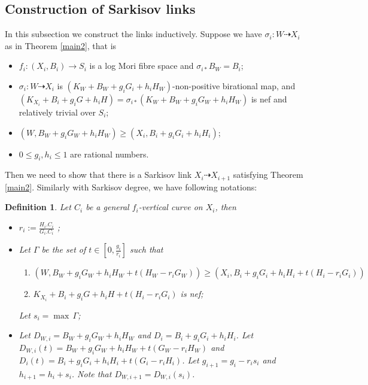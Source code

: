 \documentclass[11pt]{amsart}
\newtheorem{defn}{Definition}[section]
\begin{document}
\subsection{Construction of Sarkisov links}
In this subsection we construct the links inductively. Suppose we have $\sigma_{i}:W\dashrightarrow X_{i}$ as in Theorem  \ref{main2}, that is 
\begin{itemize}
  \item $f_{i}:(X_{i},B_{i})\to S_{i}$ is a log Mori fibre space and $\sigma_{i*} B_{W}=B_{i}$;
  \item $\sigma_{i}:W\dashrightarrow  X_{i}$ is $(K_{W}+B_{W}+g_{i}G_{i}+h_{i}H_{W})$-non-positive birational map, and $(K_{X_{i}}+B_{i}+g_{i}G+h_{i}H)=\sigma_{i*}(K_{W}+B_{W}+g_{i}G_{W}+h_{i}H_{W})$ is nef and  relatively trivial over $S_{i}$;
  \item $(W,B_{W}+g_{i}G_{W}+h_{i}H_{W})\geqslant (X_{i},B_{i}+g_{i}G_{i}+h_{i}H_{i})$;
  \item $0\leqslant g_{i},h_{i}\leqslant 1$ are  rational numbers.
\end{itemize}
Then we need to show that there is a Sarkisov link $X_{i}\dashrightarrow X_{i+1}$ satisfying  Theorem \ref{main2}. Similarly with Sarkisov degree, we have following notations:
\begin{defn}
  Let $C_{i}$ be a general $f_{i}$-vertical curve on $X_{i}$, then
  \begin{itemize}
    \item $r_{i}:=\frac{H_{i}.C_{i}}{G_{i}.C_{i}}$ ;
    \item Let $\Gamma$ be the set of $t\in [0,\frac{g_{i}}{r_{i}}] $ such that 
      \begin{enumerate}
        \item\label{singularcondition} $\left(W,B_{W}+g_{i}G_{W}+h_{i}H_{W}+t(H_{W}-r_{i}G_{W})\right)\geqslant \left(X_{i},B_{i}+g_{i}G_{i}+h_{i}H_{i}+t\left(H_{i}-r_{i}G_{i}\right)\right)$
        \item$K_{X_{i}}+B_{i}+g_{i}G+h_{i}H+t(H_{i}-r_{i}G_{i})$ is nef;
    \end{enumerate}
    Let $s_{i}=\max\, \Gamma $;
\item Let $D_{W,i}=B_{W}+g_{i}G_{W}+h_{i}H_{W}$ and $D_{i}=B_{i}+g_{i}G_{i}+h_{i}H_{i}$. Let $D_{W,i}(t)=B_{W}+g_{i}G_{W}+h_{i}H_{W}+t(G_{W}-r_{i}H_{W})$ and $D_{i}(t)=B_{i}+g_{i}G_{i}+h_{i}H_{i}+t (G_{i}-r_{i}H_{i})$. Let $g_{i+1}=g_{i}-r_{i}s_{i}$ and $h_{i+1}=h_{i}+s_{i}$. Note that $D_{W,i+1}=D_{W,i}(s_{i})$. 
  \end{itemize}
\end{defn}
\end{document}
